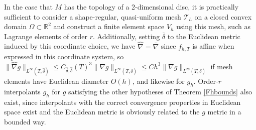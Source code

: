 \documentclass[11pt]{article}
\begin{document}
In the case that $M$ has the topology of a 2-dimensional disc, it is practically sufficient to consider a shape-regular, quasi-uniform mesh $\mathcal{T}_h$ on a closed convex domain $\Omega \subset \mathbb{R}^2$ and construct a finite element space $V_h$ using this mesh, such as Lagrange elements of order $r$. Additionally, setting $\bar \delta$ to the Euclidean metric induced by this coordinate choice, we have $\hat \nabla = \bar \nabla$ since $f_{h,T}$ is affine when expressed in this coordinate system, so $\|\hat \nabla g\|_{L^\infty(T,\hat \delta)} \le C_{\bar \delta,\hat \delta}(T)^3 \|\bar \nabla g\|_{L^\infty(T,\bar \delta)} \le Ch^3\|\bar \nabla g\|_{L^\infty(T,\bar \delta)}$ if mesh elements have Euclidean diameter $O(h)$, and likewise for $g_h$. Order-$r$ interpolants $g_h$ for $g$ satisfying the other hypotheses of Theorem \ref{Fhbounds} also exist, since interpolants with the correct convergence properties in Euclidean space exist \cite{Li,GaNe22} and the Euclidean metric is obviously related to the $g$ metric in a bounded way.
\end{document}

